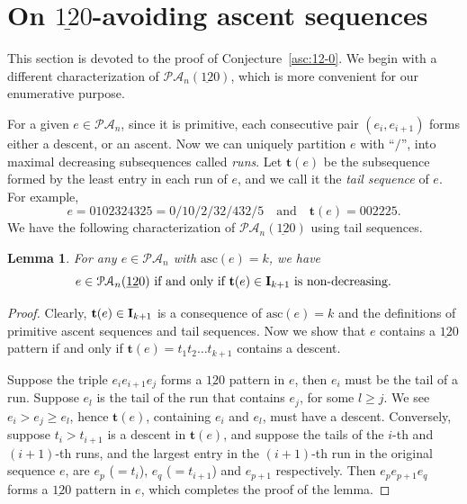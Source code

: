 \documentclass[12pt,A4]{amsart}
\numberwithin{equation}{section}
\theoremstyle{plain}
\newtheorem{lemma}[theorem]{Lemma}
\theoremstyle{definition}
\def\PA{\mathcal{PA}}
\def\asc{\mathrm{asc}}
\def\I{\operatorname{{\bf I}}}
\def\tt{\mathbf{t}}
\begin{document}
\section{On $\underline{12}0$-avoiding ascent sequences}
\label{sec:2}
This section is devoted to the proof of Conjecture~\ref{asc:12-0}. We begin with  a different characterization of $\PA_n(\underline{12}0)$, which is more convenient for our enumerative purpose.

For a given $e\in\PA_n$, since it is primitive, each consecutive pair $(e_i,e_{i+1})$ forms either a descent, or an ascent. Now we can uniquely partition $e$ with ``$\slash$'', into maximal decreasing subsequences called {\em runs}. Let $\tt(e)$ be the subsequence formed by the least entry in each run of $e$, and we call it the {\em tail sequence} of $e$. For example, $$e=0102324325=0\slash10\slash2\slash32\slash432\slash5\quad\text{and}\quad\tt(e)=002225.$$
We have the following characterization of $\PA_n(\underline{12}0)$ using tail sequences.

\begin{lemma}\label{char:12-0}
For  any $e\in\PA_n$ with $\asc(e)=k$, we have
$$e\in\PA_n(\underline{12}0) \text{ if and only if $\tt(e)\in\I_{k+1}$ is non-decreasing.} $$
\end{lemma}
\begin{proof}
Clearly, $\tt(e)\in\I_{k+1}$ is a consequence  of $\asc(e)=k$ and the definitions of primitive ascent sequences and tail sequences. Now we show that $e$ contains a $\underline{12}0$ pattern if and only if $\tt(e)=t_1t_2\ldots t_{k+1}$ contains a descent.

Suppose the triple $e_ie_{i+1}e_j$ forms a $\underline{12}0$ pattern in $e$, then $e_i$ must be the tail of a run. Suppose $e_l$ is the tail of the run that contains $e_j$, for some $l\ge j$. We see $e_i>e_j\ge e_l$, hence $\tt(e)$, containing $e_i$ and $e_l$, must have a descent. Conversely, suppose $t_i>t_{i+1}$ is a descent in $\tt(e)$, and suppose the tails of the $i$-th and $(i+1)$-th runs, and the largest entry in the $(i+1)$-th run in the original sequence $e$, are $e_p$ ($=t_i$), $e_{q}$ ($=t_{i+1}$) and $e_{p+1}$ respectively. Then $e_pe_{p+1}e_q$ forms a $\underline{12}0$ pattern in $e$, which completes the proof of the lemma.
\end{proof}

\end{document}
